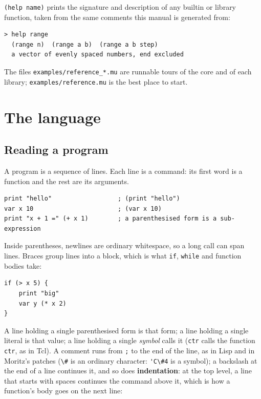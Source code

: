 \documentclass[11pt,a4paper]{article}
\newcommand{\musil}[1]{\lstinline[style=musilinline]{#1}}
\begin{document}
\musil{(help name)} prints the signature and description of any builtin or library
function, taken from the same comments this manual is generated from:

\begin{lstlisting}[numbers=none]
> help range
  (range n)  (range a b)  (range a b step)
  a vector of evenly spaced numbers, end excluded
\end{lstlisting}

The files \texttt{examples/reference\_*.mu} are runnable tours of the core and of each
library; \texttt{examples/reference.mu} is the best place to start.

\section{The language}
\label{sec:language}

\subsection{Reading a program}

A program is a sequence of lines. Each line is a command: its first word is a function
and the rest are its arguments.

\begin{lstlisting}
print "hello"                  ; (print "hello")
var x 10                       ; (var x 10)
print "x + 1 =" (+ x 1)        ; a parenthesised form is a sub-expression
\end{lstlisting}

Inside parentheses, newlines are ordinary whitespace, so a long call can span lines.
Braces group lines into a block, which is what \musil{if}, \musil{while} and
function bodies take:

\begin{lstlisting}
if (> x 5) {
    print "big"
    var y (* x 2)
}
\end{lstlisting}

A line holding a single parenthesised form is that form; a line holding a single
literal is that value; a line holding a single \emph{symbol} calls it
(\musil{ctr} calls the function \musil{ctr}, as in Tcl). A comment runs from
\musil{;} to the end of the line, as in Lisp and in Moritz's patches (\musil{\#} is an ordinary
character: \musil{'C\#4} is a symbol); a backslash at the end of a line continues it, and
so does \textbf{indentation}: at the top level, a line that starts with spaces continues
the command above it, which is how a function's body goes on the next line:
\end{document}
